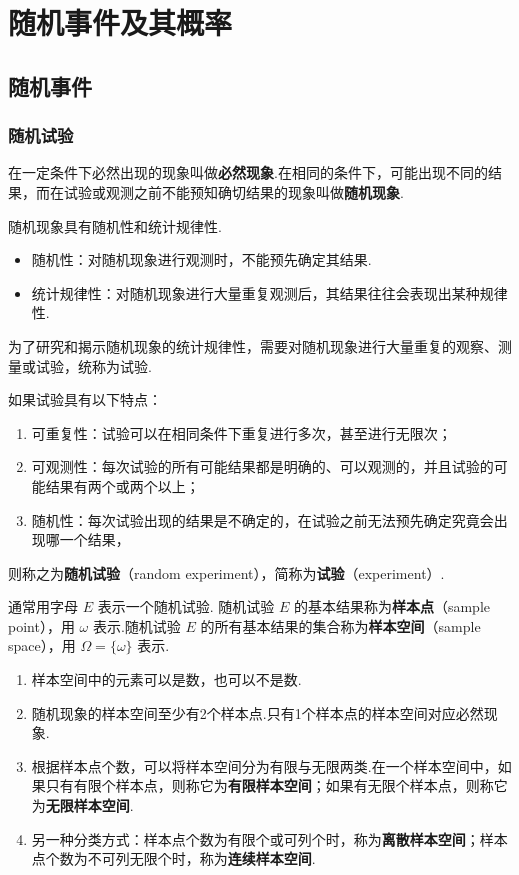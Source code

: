 
\chapter{随机事件及其概率}
\thispagestyle{plain}

\section{随机事件}

\subsection{随机试验}

在一定条件下必然出现的现象叫做\textbf{必然现象}.在相同的条件下，可能出现不同的结果，而在试验或观测之前不能预知确切结果的现象叫做\textbf{随机现象}.

随机现象具有随机性和统计规律性.

\begin{itemize}
    \item 随机性：对随机现象进行观测时，不能预先确定其结果.
    \item 统计规律性：对随机现象进行大量重复观测后，其结果往往会表现出某种规律性.
\end{itemize}

为了研究和揭示随机现象的统计规律性，需要对随机现象进行大量重复的观察、测量或试验，统称为试验.

如果试验具有以下特点：
\begin{enumerate}
    \item 可重复性：试验可以在相同条件下重复进行多次，甚至进行无限次；
    \item 可观测性：每次试验的所有可能结果都是明确的、可以观测的，并且试验的可能结果有两个或两个以上；
    \item 随机性：每次试验出现的结果是不确定的，在试验之前无法预先确定究竟会出现哪一个结果，
\end{enumerate}
则称之为\textbf{随机试验}（random experiment），简称为\textbf{试验}（experiment）.

通常用字母 $E$ 表示一个随机试验. 随机试验 $E$ 的基本结果称为\textbf{样本点}（sample point），用 $\omega$ 表示.随机试验 $E$ 的所有基本结果的集合称为\textbf{样本空间}（sample space），用 $\varOmega = \{ \omega \}$ 表示.

\begin{note}
    \begin{enumerate}
        \item 样本空间中的元素可以是数，也可以不是数.
        \item 随机现象的样本空间至少有2个样本点.只有1个样本点的样本空间对应必然现象.
        \item 根据样本点个数，可以将样本空间分为有限与无限两类.在一个样本空间中，如果只有有限个样本点，则称它为\textbf{有限样本空间}；如果有无限个样本点，则称它为\textbf{无限样本空间}.
        \item 另一种分类方式：样本点个数为有限个或可列个时，称为\textbf{离散样本空间}；样本点个数为不可列无限个时，称为\textbf{连续样本空间}.
    \end{enumerate}
\end{note}

